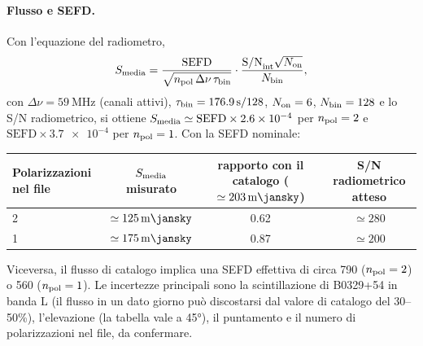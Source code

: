 \paragraph{Flusso e SEFD.} Con l'equazione del radiometro,
\begin{equation}
S_{\rm media}=\frac{\text{SEFD}}{\sqrt{n_{\rm pol}\,\Delta\nu\,\tau_{\rm bin}}}\cdot
\frac{\text{S/N}_{\rm int}\sqrt{N_{\rm on}}}{N_{\rm bin}},
\end{equation}
con $\Delta\nu=\SI{59}{\mega\hertz}$ (canali attivi), $\tau_{\rm bin}=\SI{176.9}{\second}/128$, $N_{\rm on}=6$,
$N_{\rm bin}=128$ e lo S/N radiometrico, si ottiene $S_{\rm media}\simeq \text{SEFD}\times\num{2.6e-4}$ per
$n_{\rm pol}=2$ e $\text{SEFD}\times\num{3.7e-4}$ per $n_{\rm pol}=1$. Con la SEFD nominale:
\begin{center}
\small
\begin{tabular}{lccc}
\toprule
Polarizzazioni nel file & $S_{\rm media}$ misurato & rapporto con il catalogo ($\simeq\SI{203}{\milli\jansky}$) &
  S/N radiometrico atteso \\
\midrule
2 & $\simeq\SI{125}{\milli\jansky}$ & 0.62 & $\simeq280$ \\
1 & $\simeq\SI{175}{\milli\jansky}$ & 0.87 & $\simeq200$ \\
\bottomrule
\end{tabular}
\end{center}
Viceversa, il flusso di catalogo implica una SEFD effettiva di circa \SI{790}{\jansky} ($n_{\rm pol}=2$) o
\SI{560}{\jansky} ($n_{\rm pol}=1$). Le incertezze principali sono la scintillazione di B0329+54 in banda L (il flusso in
un dato giorno può discostarsi dal valore di catalogo del 30--50\%), l'elevazione (la tabella vale a \ang{45}), il
puntamento e il numero di polarizzazioni nel file, da confermare. 

